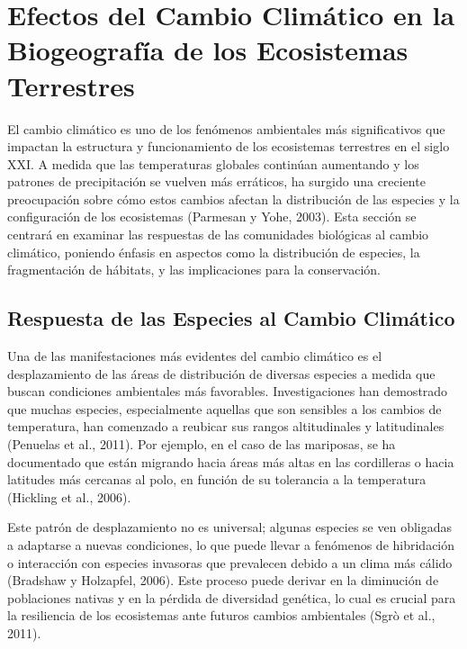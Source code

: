 \documentclass[
  letterpaper,
  DIV=11,
  numbers=noendperiod,
  oneside]{scrreprt}
\begin{document}
\chapter{Efectos del Cambio Climático en la Biogeografía de los
Ecosistemas
Terrestres}\label{efectos-del-cambio-climuxe1tico-en-la-biogeografuxeda-de-los-ecosistemas-terrestres}

El cambio climático es uno de los fenómenos ambientales más
significativos que impactan la estructura y funcionamiento de los
ecosistemas terrestres en el siglo XXI. A medida que las temperaturas
globales continúan aumentando y los patrones de precipitación se vuelven
más erráticos, ha surgido una creciente preocupación sobre cómo estos
cambios afectan la distribución de las especies y la configuración de
los ecosistemas (Parmesan y Yohe, 2003). Esta sección se centrará en
examinar las respuestas de las comunidades biológicas al cambio
climático, poniendo énfasis en aspectos como la distribución de
especies, la fragmentación de hábitats, y las implicaciones para la
conservación.

\section{Respuesta de las Especies al Cambio
Climático}\label{respuesta-de-las-especies-al-cambio-climuxe1tico}

Una de las manifestaciones más evidentes del cambio climático es el
desplazamiento de las áreas de distribución de diversas especies a
medida que buscan condiciones ambientales más favorables.
Investigaciones han demostrado que muchas especies, especialmente
aquellas que son sensibles a los cambios de temperatura, han comenzado a
reubicar sus rangos altitudinales y latitudinales (Penuelas et al.,
2011). Por ejemplo, en el caso de las mariposas, se ha documentado que
están migrando hacia áreas más altas en las cordilleras o hacia
latitudes más cercanas al polo, en función de su tolerancia a la
temperatura (Hickling et al., 2006).

Este patrón de desplazamiento no es universal; algunas especies se ven
obligadas a adaptarse a nuevas condiciones, lo que puede llevar a
fenómenos de hibridación o interacción con especies invasoras que
prevalecen debido a un clima más cálido (Bradshaw y Holzapfel, 2006).
Este proceso puede derivar en la diminución de poblaciones nativas y en
la pérdida de diversidad genética, lo cual es crucial para la
resiliencia de los ecosistemas ante futuros cambios ambientales (Sgrò et
al., 2011).
\end{document}
